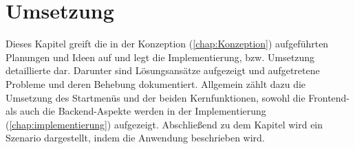 

\chapter{Umsetzung}
\label{chap:Umsetzung}
Dieses Kapitel greift die in der Konzeption (\ref{chap:Konzeption}) aufgeführten Planungen und Ideen auf und legt die Implementierung, bzw. 
Umsetzung detaillierte dar. Darunter sind Lösungsansätze aufgezeigt und aufgetretene Probleme und deren Behebung dokumentiert. Allgemein zählt 
dazu die Umsetzung des Startmenüs und der beiden Kernfunktionen, sowohl die Frontend- als auch die Backend-Aspekte werden in der Implementierung 
(\ref{chap:implementierung}) aufgezeigt. Abschließend zu dem Kapitel wird ein Szenario dargestellt, indem die Anwendung beschrieben wird.

